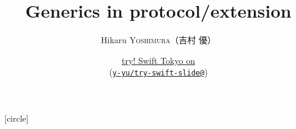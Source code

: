 \setmonofont[Ligatures=TeX]{CMU Typewriter Text}

\newcommand{\xcolon}{：}

\title[Generics in protocol/extension]{%
  {\bfseries\rmfamily\mcfamily\huge
    Generics in protocol/extension%
  }%
}
\author[Hikaru Yoshimura]{%
  Hikaru \textsc{Yoshimura}（吉村 優）
}
\date[try! Swift Tokyo, March 21, 2019]{%
  \href{https://www.tryswift.co/events/2019/tokyo/en/}{try! Swift Tokyo on } \\
  {\scriptsize (\href{https://github.com/y-yu/try-swift-slide}{\texttt{y-yu/try-swift-slide@\GITAbrHash}})}%
}








[circle]

\newcommand\ballcircle[1]{%
  {%
    \usebeamercolor{enumerate item}%
    \tikzset{beameritem/.style={circle,inner sep=0,minimum size=2ex,text=enumerate item.bg,fill=enumerate item.fg,font=\footnotesize}}%
    \tikz[baseline=(n.base)]\node(n)[beameritem]{#1};%
  }
}
\newcommand\ballref[1]{%
  \ballcircle{\ref{#1}}
}

\newcommand\ce[1]{%
  \coloremoji{#1}
}

\newenvironment{notes}
  {%
    \begin{xlrbox}{NotesBox}
    \begin{minipage}{.95\textwidth}
    \small\rmfamily\mcfamily
    \begin{itemize}
    \setlength{\itemindent}{0em}
  }{%
    \end{itemize}
    \end{minipage}
    \end{xlrbox}
    \note{\theNotesBox}}

\makeatletter
\newsavebox\temp@simple@callout@box
\newcommand{\simplecallout}[3]{%
  \sbox{\temp@simple@callout@box}{\mbox{#3}}%
  \begin{center}%
    \begin{tikzpicture}%
      \calloutquote[width=1.1\wd\temp@simple@callout@box,position={(#1.5,-0.2)},fill=#2,rounded corners]{
        #3%
      }%
    \end{tikzpicture}%
  \end{center}
}
\makeatother
  


